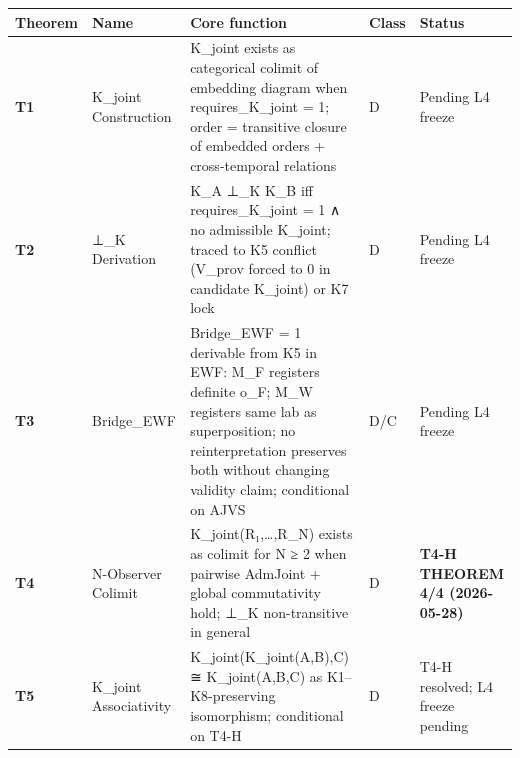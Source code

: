 \documentclass[
  11pt,
]{article}
\newcounter{none} %
\begin{document}
{\def\LTcaptype{none} %
\begin{longtable}[]{@{}
  >{\raggedright\arraybackslash}p{}
  >{\raggedright\arraybackslash}p{}
  >{\raggedright\arraybackslash}p{}
  >{\raggedright\arraybackslash}p{}
  >{\raggedright\arraybackslash}p{}@{}}
\toprule\noalign{}
\begin{minipage}[b]{\linewidth}\raggedright
Theorem
\end{minipage} & \begin{minipage}[b]{\linewidth}\raggedright
Name
\end{minipage} & \begin{minipage}[b]{\linewidth}\raggedright
Core function
\end{minipage} & \begin{minipage}[b]{\linewidth}\raggedright
Class
\end{minipage} & \begin{minipage}[b]{\linewidth}\raggedright
Status
\end{minipage} \\
\midrule\noalign{}
\endhead
\bottomrule\noalign{}
\endlastfoot
\textbf{T1} & K\_joint Construction & K\_joint exists as categorical
colimit of embedding diagram when requires\_K\_joint = 1; order =
transitive closure of embedded orders + cross-temporal relations & D &
Pending L4 freeze \\
\textbf{T2} & ⊥\_K Derivation & K\_A ⊥\_K K\_B iff requires\_K\_joint =
1 ∧ no admissible K\_joint; traced to K5 conflict (V\_prov forced to 0
in candidate K\_joint) or K7 lock & D & Pending L4 freeze \\
\textbf{T3} & Bridge\_EWF & Bridge\_EWF = 1 derivable from K5 in EWF:
M\_F registers definite o\_F; M\_W registers same lab as superposition;
no reinterpretation preserves both without changing validity claim;
conditional on AJVS & D/C & Pending L4 freeze \\
\textbf{T4} & N-Observer Colimit & K\_joint(R₁,\ldots,R\_N) exists as
colimit for N ≥ 2 when pairwise AdmJoint + global commutativity hold;
⊥\_K non-transitive in general & D & \textbf{T4-H THEOREM 4/4
(2026-05-28)} \\
\textbf{T5} & K\_joint Associativity & K\_joint(K\_joint(A,B),C) ≅
K\_joint(A,B,C) as K1--K8-preserving isomorphism; conditional on T4-H &
D & T4-H resolved; L4 freeze pending \\

\end{longtable}}
\end{document}
